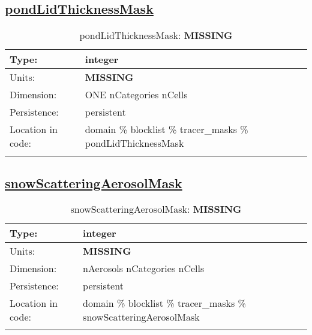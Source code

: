 \subsection[pondLidThicknessMask]{\hyperref[sec:var_tab_tracer_masks]{pondLidThicknessMask}}
\label{subsec:var_sec_tracer_masks_pondLidThicknessMask}
\begin{center}
\begin{longtable}{| p{2.0in} | p{4.0in} |}
        \hline 
        Type: & integer \\
        \hline 
        Units: & {\bf \color{red} MISSING} \\
        \hline 
        Dimension: & ONE nCategories nCells \\
        \hline 
        Persistence: & persistent \\
        \hline 
         Location in code: & domain \% blocklist \% tracer\_masks \% pondLidThicknessMask \\
         \hline 
    \caption{pondLidThicknessMask: {\bf \color{red} MISSING}}
\end{longtable}
\end{center}
\subsection[snowScatteringAerosolMask]{\hyperref[sec:var_tab_tracer_masks]{snowScatteringAerosolMask}}
\label{subsec:var_sec_tracer_masks_snowScatteringAerosolMask}
\begin{center}
\begin{longtable}{| p{2.0in} | p{4.0in} |}
        \hline 
        Type: & integer \\
        \hline 
        Units: & {\bf \color{red} MISSING} \\
        \hline 
        Dimension: & nAerosols nCategories nCells \\
        \hline 
        Persistence: & persistent \\
        \hline 
         Location in code: & domain \% blocklist \% tracer\_masks \% snowScatteringAerosolMask \\
         \hline 
    \caption{snowScatteringAerosolMask: {\bf \color{red} MISSING}}
\end{longtable}
\end{center}
